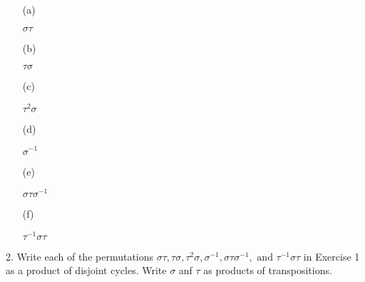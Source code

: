 \begin{mdframed}[style=darkAnswer,frametitle={Joe Starr}]
  \begin{itemize}
    \item [(a)]{$\sigma\tau$
      
    }
    \item [(b)]{$\tau\sigma$

    }
    \item [(c)]{$\tau^2\sigma$

    }
    \item [(d)]{$\sigma^{-1}$

    }
    \item [(e)]{$\sigma\tau\sigma^{-1}$

    }
    \item [(f)]{$\tau^{-1}\sigma\tau$

    }
  \end{itemize}
\end{mdframed}
\newpage
\begin{mdframed}[style=darkQuesion]
  2. Write each of the permutations $\sigma\tau, \tau\sigma, \tau^2\sigma, 
  \sigma^{-1}, \sigma\tau\sigma^{-1}, \text{ and } \tau^{-1}\sigma\tau$ in 
  Exercise 1 as a product of disjoint cycles. Write $\sigma$ anf $\tau$ as 
  products of transpositions. 
\end{mdframed}
  
